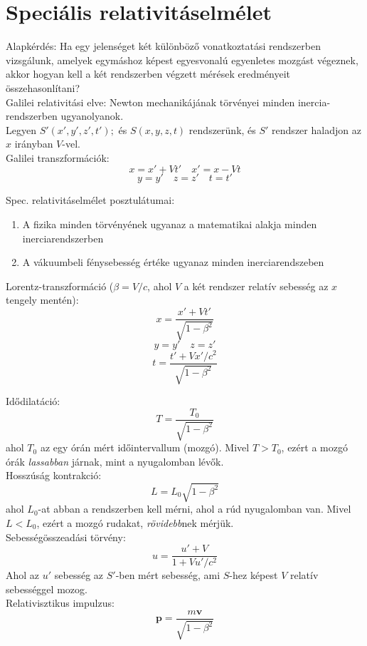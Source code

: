 \documentclass[12pt,a4paper,twocolumn]{article}
\begin{document}
  \section{Speciális relativitáselmélet}

  Alapkérdés: Ha egy jelenséget két különböző vonatkoztatási rendszerben vizsgálunk, amelyek egymáshoz képest egyesvonalú
  egyenletes mozgást végeznek, akkor hogyan kell a két rendszerben végzett mérések eredményeit összehasonlítani?\\

  Galilei relativitási elve: Newton mechanikájának törvényei minden inercia-rendszerben ugyanolyanok.\\
  
  Legyen $S'(x', y', z', t');$ és $S(x, y, z, t)$ rendszerünk, és $S'$ rendszer haladjon az $x$ irányban $V$-vel.\\
  Galilei transzformációk:
  \[x = x' + Vt' \quad x' = x - Vt\]
  \[y = y' \quad z = z' \quad t = t'\]

  Spec. relativitáselmélet posztulátumai:
  \begin{enumerate}
    \item A fizika minden törvényének ugyanaz a matematikai alakja minden inerciarendszerben
    \item A vákuumbeli fénysebesség értéke ugyanaz minden inerciarendszeben
  \end{enumerate}

  Lorentz-transzformáció ($\beta = V/c$, ahol $V$ a két rendszer relatív sebesség az $x$ tengely mentén):
  \[x = \frac{x'+Vt'}{\sqrt{1-\beta^2}}\]
  \[y = y' \quad z = z'\]
  \[t = \frac{t'+Vx'/c^2}{\sqrt{1-\beta^2}}\]

  Idődilatáció:
  \[\boxed{T = \frac{T_0}{\sqrt{1-\beta^2}}}\]
  ahol $T_0$ az egy órán mért időintervallum (mozgó). Mivel $T>T_0$, ezért a mozgó órák \textit{lassabban} járnak,
  mint a nyugalomban lévők.\\

  Hosszúság kontrakció:
  \[\boxed{L = L_0\sqrt{1-\beta^2}}\]
  ahol $L_0$-at abban a rendszerben kell mérni, ahol a rúd nyugalomban van. Mivel $L < L_0$, ezért a mozgó rudakat,
  \textit{rövidebb}nek mérjük.\\

  Sebességösszeadási törvény:
  \[u = \frac{u' + V}{1 + Vu'/c^2}\]
  Ahol az $u'$ sebesség az $S'$-ben mért sebesség, ami $S$-hez képest $V$ relatív sebességgel mozog.\\

  Relativisztikus impulzus:
  \[\mathbf{p} = \frac{m\mathbf{v}}{\sqrt{1-\beta^2}}\]
\end{document}
